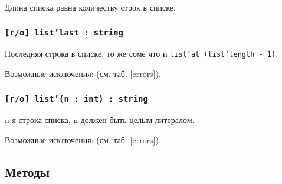 Длина списка равна количеству строк в списке.

\subsubsection{\texttt{[r/o] list'last : string}}

Последняя строка в списке, то же соме что и \texttt{list'at (list'length - 1)}.

Возможные исключения:  (см. таб. \ref{errors}).

\subsubsection{\texttt{[r/o] list'(n : int) : string}}

n-я строка списка, n должен быть целым литералом.

Возможные исключения:  (см. таб. \ref{errors}).

\subsection{Методы}

